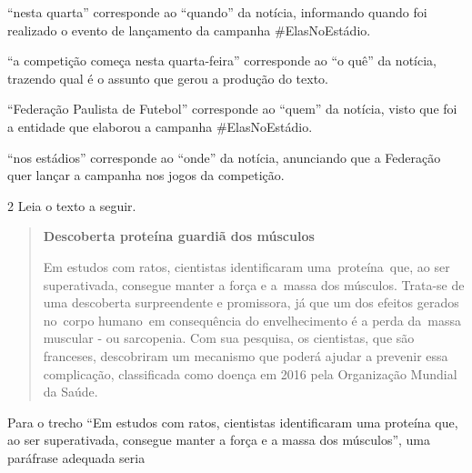 \begin{escolha}
\item ``nesta quarta'' corresponde ao ``quando'' da notícia, informando
quando foi realizado o evento de lançamento da campanha \#ElasNoEstádio.

\item ``a competição começa nesta quarta-feira'' corresponde ao ``o quê''
da notícia, trazendo qual é o assunto que gerou a produção do texto.

\item ``Federação Paulista de Futebol'' corresponde ao ``quem'' da
notícia, visto que foi a entidade que elaborou a campanha
\#ElasNoEstádio.

\item ``nos estádios'' corresponde ao ``onde'' da notícia, anunciando que
a Federação quer lançar a campanha nos jogos da competição.
\end{escolha}


\num{2} Leia o texto a seguir.

\begin{quote}
\textbf{Descoberta proteína guardiã dos músculos}


Em estudos com ratos, cientistas identificaram uma~proteína~que, ao ser
superativada, consegue manter a força e a~massa dos músculos. Trata-se
de uma descoberta surpreendente e promissora, já que um dos efeitos
gerados no~corpo humano~em consequência do envelhecimento é a perda
da~massa muscular - ou sarcopenia. Com sua pesquisa, os cientistas, que
são franceses, descobriram um mecanismo que poderá ajudar a prevenir
essa complicação, classificada como doença em 2016 pela Organização
Mundial da Saúde.

\end{quote}

Para o trecho ``Em estudos com ratos, cientistas identificaram uma
proteína que, ao ser superativada, consegue manter a força e a massa dos
músculos'', uma paráfrase adequada seria

